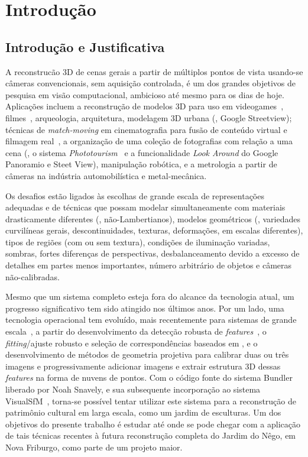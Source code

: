 \chapter{Introdução} \label{cap:intro}

\section{Introdução e Justificativa}

A reconstrucão 3D de cenas gerais a partir de múltiplos pontos de vista
usando-se câmeras convencionais, sem aquisição controlada, é um dos grandes
objetivos de pesquisa em visão computacional, ambicioso até mesmo para os dias
de hoje. Aplicações incluem a reconstrução de modelos 3D para uso em
videogames~\cite{ablan2007digital}, filmes~\cite{ablan2007digital},
arqueologia, arquitetura, modelagem 3D urbana (\eg, Google Streetview); técnicas
de \emph{match-moving} em cinematografia para fusão de conteúdo virtual e
filmagem real~\cite{dobbert2012matchmoving}, a organização de uma coleção de
fotografias com relação a uma cena (\eg, o sistema
\emph{Phototourism}~\cite{agarwal2010reconstructing} e a funcionalidade
\emph{Look Around} do Google Panoramio e Steet View), manipulação robótica, e a
metrologia a partir de câmeras na indústria automobilística e metal-mecânica.

Os desafios estão ligados às escolhas de grande escala de
representações adequadas e de técnicas que possam modelar simultaneamente com
materiais drasticamente diferentes (\eg, não-Lambertianos), modelos
geométricos (\eg, variedades curvilíneas gerais, descontinuidades, texturas,
deformações, em escalas diferentes), tipos de regiões (com ou sem textura),
condições de iluminação variadas, sombras, fortes diferenças de perspectivas,
desbalanceamento devido a excesso de detalhes em partes menos importantes,
número arbitrário de objetos e câmeras não-calibradas.

Mesmo que um sistema completo esteja fora do alcance da tecnologia atual,
um progresso significativo tem sido atingido nos últimos anos. Por um lado,
uma tecnologia operacional tem evoluído, mais recentemente para sistemas de grande
escala~\cite{agarwal2011building},
a partir do desenvolvimento da detecção robusta de
\emph{features}~\cite{mikolajczyk2002detection}, o
\emph{fitting}/ajuste robusto e seleção de correspondências baseados em \ransac, e o
desenvolvimento de métodos de geometria projetiva para calibrar duas ou três
imagens e progressivamente adicionar imagens e extrair estrutura 3D dessas
\emph{features} na forma de nuvens de pontos. Com o código fonte do sistema
Bundler~\cite{snavely2010bundler} liberado por Noah Snavely, e sua subsequente incorporação
ao sistema VisualSfM~\cite{wu2011visualsfm}, torna-se possível tentar utilizar este sistema para a
reconstrução de patrimônio cultural em larga escala, como um jardim de
esculturas. Um dos objetivos do presente trabalho é estudar até onde se pode
chegar com a aplicação de tais técnicas recentes à futura reconstrução completa do Jardim
do Nêgo, em Nova Friburgo, como parte de um projeto maior.

